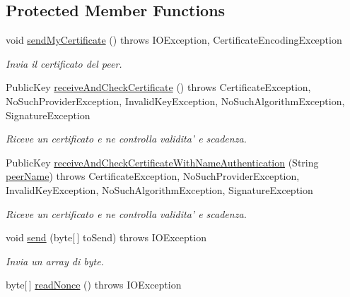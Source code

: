 \subsection*{\-Protected \-Member \-Functions}
\begin{DoxyCompactItemize}
\item 
void \hyperlink{classit_1_1saccosilvestri_1_1jsp2p_1_1protocol_1_1_protocol_a6422be451c4fbb04daf3a9095b602983}{send\-My\-Certificate} ()  throws I\-O\-Exception, 			\-Certificate\-Encoding\-Exception 
\begin{DoxyCompactList}\small\item\em \-Invia il certificato del peer. \end{DoxyCompactList}\item 
\-Public\-Key \hyperlink{classit_1_1saccosilvestri_1_1jsp2p_1_1protocol_1_1_protocol_a6628dda63e060c54636d853d6ddca302}{receive\-And\-Check\-Certificate} ()  throws Certificate\-Exception, No\-Such\-Provider\-Exception, 			\-Invalid\-Key\-Exception, No\-Such\-Algorithm\-Exception, Signature\-Exception 
\begin{DoxyCompactList}\small\item\em \-Riceve un certificato e ne controlla validita' e scadenza. \end{DoxyCompactList}\item 
\-Public\-Key \hyperlink{classit_1_1saccosilvestri_1_1jsp2p_1_1protocol_1_1_protocol_a885c549e3b4144c1e8b3bb0d625ab470}{receive\-And\-Check\-Certificate\-With\-Name\-Authentication} (\-String \hyperlink{classit_1_1saccosilvestri_1_1jsp2p_1_1protocol_1_1_protocol_a6dcf1366f63023a80091ab663ecd3060}{peer\-Name})  throws Certificate\-Exception, No\-Such\-Provider\-Exception, 			\-Invalid\-Key\-Exception, No\-Such\-Algorithm\-Exception, Signature\-Exception 
\begin{DoxyCompactList}\small\item\em \-Riceve un certificato e ne controlla validita' e scadenza. \end{DoxyCompactList}\item 
void \hyperlink{classit_1_1saccosilvestri_1_1jsp2p_1_1protocol_1_1_protocol_aa3b2ceec3724182847671516bdcff638}{send} (byte\mbox{[}$\,$\mbox{]} to\-Send)  throws I\-O\-Exception 
\begin{DoxyCompactList}\small\item\em \-Invia un array di byte. \end{DoxyCompactList}\item 
byte\mbox{[}$\,$\mbox{]} \hyperlink{classit_1_1saccosilvestri_1_1jsp2p_1_1protocol_1_1_protocol_a29c231a6d7e79cf496e3f7f20cbdcbf3}{read\-Nonce} ()  throws I\-O\-Exception 

\end{DoxyCompactItemize}
